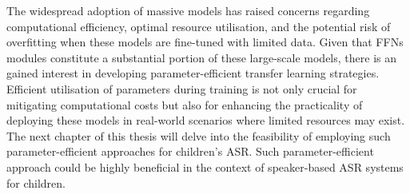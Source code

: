 The widespread adoption of massive models has raised concerns regarding computational efficiency, optimal resource utilisation, and the potential risk of overfitting when these models are fine-tuned with limited data. Given that \ac{FFN}s modules constitute a substantial portion of these large-scale models, there is an gained interest in developing parameter-efficient transfer learning strategies. Efficient utilisation of parameters during training is not only crucial for mitigating computational costs but also for enhancing the practicality of deploying these models in real-world scenarios where limited resources may exist.
The next chapter of this thesis will delve into the feasibility of employing such parameter-efficient approaches for children's \ac{ASR}. Such parameter-efficient approach could be highly beneficial in the context of speaker-based \ac{ASR} systems for children. 
